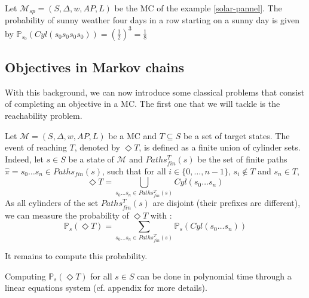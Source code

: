 \begin{example}
  Let $\mathcal{M}_{sp} = (S, \Delta, w, AP, L)$ be the MC of the example \ref{solar-pannel}. The probability of sunny weather four days in a row starting on a sunny day is given
  by $\mathbb{P}_{s_0}(Cyl(s_0s_0s_0s_0)) = (\frac{1}{2})^3 = \frac{1}{8}$
\end{example}

\subsection{Objectives in Markov chains}

With this background, we can now introduce some classical problems that consist
of completing an objective in a MC. The first one that we will tackle is the reachability problem.
\begin{definition}
  Let $\mathcal{M} = (S, \Delta, w, AP, L)$ be a MC and $T \subseteq S$ be a set of target states. The event of reaching $T$, denoted by $\Diamond T$,
  is defined as a finite union of cylinder sets. Indeed, let $s \in S$ be a state of $\mathcal{M}$ and $Paths_{fin}^T(s)$ be the set of finite paths $\hat{\pi} = s_0 \dots s_n \in Paths_{fin}(s)$, such that for all $i \in \{0, \dots, n-1 \}, \, s_i \not \in T$ and $s_n \in T$,
  \[ \Diamond T = \bigcup_{s_0 \dots s_n \in Paths_{fin}^T(s)} Cyl(s_0 \dots s_n) \]
  As all cylinders of the set $Paths_{fin}^T(s)$ are disjoint (their prefixes are different), we can measure the probability of $\Diamond T$ with :
  \[
    \mathbb{P}_s(\Diamond T) = \sum_{s_0 \dots s_n \in Paths_{fin}^T(s)}  \mathbb{P}_s(Cyl(s_0 \dots s_n))
  \]
\end{definition}
It remains to compute this probability.

\begin{theorem}
Computing $\mathbb{P}_s(\Diamond T)$ for all $s \in S$ can be done in polynomial
time through a linear equations system (cf. appendix for more details).
\end{theorem}


